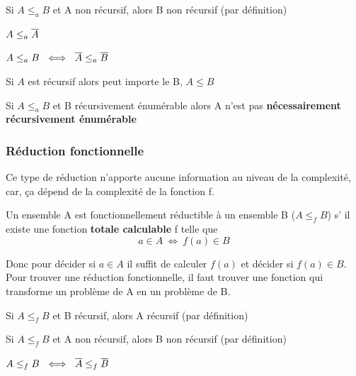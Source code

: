 \begin{myprop}
	Si $A \leq_a B$ et A non récursif, alors B non récursif (par définition)
\end{myprop}

\begin{myprop}
	$A \leq_a \overline{A}$
\end{myprop}

\begin{myprop}
	$A \leq_a B \ \iff \ \overline{A} \leq_a \overline{B}$
\end{myprop}

\begin{myprop}
	Si $A$ est récursif alors peut importe le B, $A \leq B$
\end{myprop}

\begin{myprop}
	Si $A \leq_a B$ et B récursivement énumérable alors A n'est pas 
	\textbf{nécessairement récursivement énumérable}
\end{myprop}

\subsubsection{Réduction fonctionnelle}
Ce type de réduction n'apporte aucune information au niveau de la complexité,
car, ça dépend de la complexité de la fonction f.

\begin{mydef}
	Un ensemble A est fonctionnellement réductible à un ensemble B 
	($A\leq_f B$) s’ il existe une fonction \textbf{totale calculable} f 
	telle que 
	\[ a\in A \ \iff \ f(a) \in B \]
\end{mydef}

\begin{myrem}
	Donc pour décider si $a\in A$ il suffit de calculer $f(a)$ et décider si 
	$f(a) \in B$. Pour trouver une réduction fonctionnelle, il faut trouver 
	une fonction qui transforme un problème de A en un problème de B.
\end{myrem}

\begin{myprop}
	Si $A \leq_f B$ et B récursif, alors A récursif (par définition)
\end{myprop}

\begin{myprop}
	Si $A \leq_f B$ et A non récursif, alors B non récursif (par définition)
\end{myprop}

\begin{myprop}
	$A \leq_f B \ \iff \ \overline{A} \leq_f \overline{B}$
\end{myprop}


